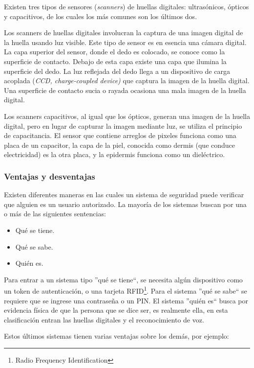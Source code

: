 Existen tres tipos de sensores (\textit{scanners}) de huellas digitales: ultrasónicos, ópticos y capacitivos, de los cuales los más comunes son los últimos dos.

Los scanners de huellas digitales involucran la captura de una imagen digital de la huella usando luz visible. Este tipo de sensor es en esencia una cámara digital. La capa superior del sensor, donde el dedo es colocado, se conoce como la superficie de contacto. Debajo de esta capa existe una capa que ilumina la superficie del dedo. La luz reflejada del dedo llega a un dispositivo de carga acoplada (\textit{CCD, charge-coupled device)} que captura la imagen de la huella digital. Una superficie de contacto sucia o rayada ocasiona una mala imagen de la huella digital.

Los scanners capacitivos, al igual que los ópticos, generan una imagen de la huella digital, pero en lugar de capturar la imagen mediante luz, se utiliza el principio de capacitancia. El sensor que contiene arreglos de pixeles funciona como una placa de un capacitor, la  capa de la piel, conocida como dermis (que conduce electricidad) es la otra placa, y la epidermis funciona como un dieléctrico.

\subsubsection{Ventajas y desventajas}
\label{sec:fp_pros_cons}

Existen diferentes maneras en las cuales un sistema de seguridad puede verificar que alguien es un usuario autorizado. La mayoría de los sistemas buscan por una o más de las siguientes sentencias:

\begin{itemize}
 \item Qué se tiene.
 \item Qué se sabe.
 \item Quién es.
\end{itemize}

Para entrar a un sistema tipo ''qué se tiene``, se necesita algún dispositivo como un token de autenticación, o una tarjeta RFID\footnote{Radio Frequency Identification}. Para el sistema ''qué se sabe`` se requiere que se ingrese una contraseña o un PIN. El sistema ''quién es`` busca por evidencia física de que la persona que se dice ser, es realmente ella, en esta clasificación entran las huellas digitales y el reconocimiento de voz.

Estos últimos sistemas tienen varias ventajas sobre los demás, por ejemplo:

